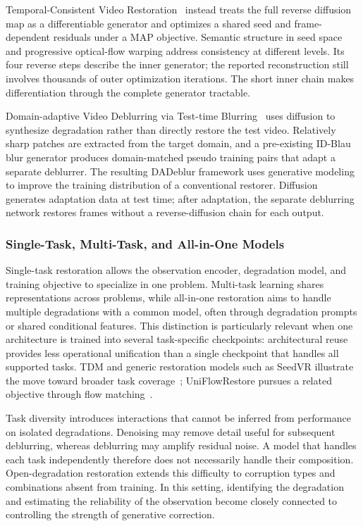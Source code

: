Temporal-Consistent Video Restoration~\cite{tcvr} instead treats the full reverse diffusion map as a differentiable generator and optimizes a shared seed and frame-dependent residuals under a MAP objective. Semantic structure in seed space and progressive optical-flow warping address consistency at different levels. Its four reverse steps describe the inner generator; the reported reconstruction still involves thousands of outer optimization iterations. The short inner chain makes differentiation through the complete generator tractable.

Domain-adaptive Video Deblurring via Test-time Blurring~\cite{dadeblur} uses diffusion to synthesize degradation rather than directly restore the test video. Relatively sharp patches are extracted from the target domain, and a pre-existing ID-Blau blur generator produces domain-matched pseudo training pairs that adapt a separate deblurrer. The resulting DADeblur framework uses generative modeling to improve the training distribution of a conventional restorer. Diffusion generates adaptation data at test time; after adaptation, the separate deblurring network restores frames without a reverse-diffusion chain for each output.

\subsubsection{Single-Task, Multi-Task, and All-in-One Models}
Single-task restoration allows the observation encoder, degradation model, and training objective to specialize in one problem. Multi-task learning shares representations across problems, while all-in-one restoration aims to handle multiple degradations with a common model, often through degradation prompts or shared conditional features. This distinction is particularly relevant when one architecture is trained into several task-specific checkpoints: architectural reuse provides less operational unification than a single checkpoint that handles all supported tasks. TDM and generic restoration models such as SeedVR illustrate the move toward broader task coverage~\cite{tdm,seedvr}; UniFlowRestore pursues a related objective through flow matching~\cite{uniflowrestore}.

Task diversity introduces interactions that cannot be inferred from performance on isolated degradations. Denoising may remove detail useful for subsequent deblurring, whereas deblurring may amplify residual noise. A model that handles each task independently therefore does not necessarily handle their composition. Open-degradation restoration extends this difficulty to corruption types and combinations absent from training. In this setting, identifying the degradation and estimating the reliability of the observation become closely connected to controlling the strength of generative correction.

